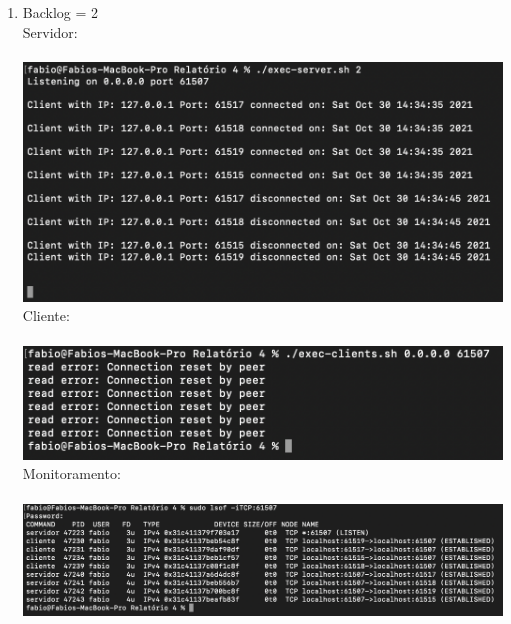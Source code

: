 \documentclass[12pt,a4paper]{report}
\begin{document}
\begin{enumerate}
\begin{enumerate}
        \item Backlog = 2\\
        Servidor:\\\\
        \includegraphics[width=1\textwidth]{images/servidor-backlog-2.png}
        Cliente:\\\\
        \includegraphics[width=1\textwidth]{images/cliente-backlog-2.png}
        Monitoramento:\\\\
        \includegraphics[width=1\textwidth]{images/lsof-backlog-2.png}
        

\end{enumerate}
\end{enumerate}
\end{document}
